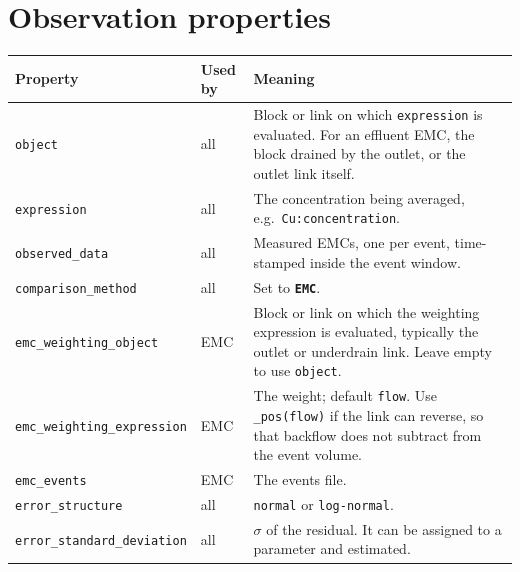 \documentclass[11pt,a4paper]{article}
\newcommand{\code}[1]{\texttt{\small #1}}
\begin{document}
\section{Observation properties}
\begin{longtable}{>{\raggedright\arraybackslash}p{}>{\raggedright\arraybackslash}p{}>{\raggedright\arraybackslash}p{}}
\toprule
Property & Used by & Meaning \\
\midrule
\code{object} & all & Block or link on which \code{expression} is evaluated. For an effluent EMC, the block drained by the outlet, or the outlet link itself. \\
\code{expression} & all & The concentration being averaged, e.g.\ \code{Cu:concentration}. \\
\code{observed\_data} & all & Measured EMCs, one per event, time-stamped inside the event window. \\
\code{comparison\_method} & all & Set to \textbf{\code{EMC}}. \\
\code{emc\_weighting\_object} & EMC & Block or link on which the weighting expression is evaluated, typically the outlet or underdrain link. Leave empty to use \code{object}. \\
\code{emc\_weighting\_expression} & EMC & The weight; default \code{flow}. Use \code{\_pos(flow)} if the link can reverse, so that backflow does not subtract from the event volume. \\
\code{emc\_events} & EMC & The events file. \\
\code{error\_structure} & all & \code{normal} or \code{log-normal}. \\
\code{error\_standard\_deviation} & all & $\sigma$ of the residual. It can be assigned to a parameter and estimated. \\
\bottomrule
\end{longtable}
\end{document}
